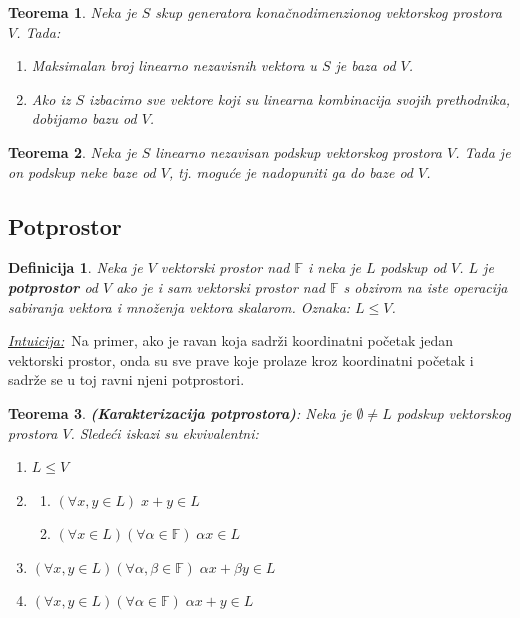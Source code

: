 \documentclass[a4paper,12pt,twoside]{report}
\newtheorem{theorem}{Teorema}[section]
\newtheorem{definition}{Definicija}[section]
\numberwithin{algorithm}{section}
\newcommand{\intuicija}{\noindent\underline{\textit{Intuicija:}}\ }
\begin{document}
\begin{theorem}
    Neka je $S$ skup generatora konačnodimenzionog vektorskog prostora $V$. Tada:
    \begin{enumerate}
        \item Maksimalan broj linearno nezavisnih vektora u $S$ je baza od $V$.
        \item Ako iz $S$ izbacimo sve vektore koji su linearna kombinacija svojih prethodnika, dobijamo bazu od $V$.
    \end{enumerate}
\end{theorem}

\begin{theorem}
    Neka je $S$ linearno nezavisan podskup vektorskog prostora $V$. Tada je on podskup neke baze od $V$, tj. moguće je nadopuniti ga do baze od $V$.
\end{theorem}

\subsection{Potprostor}

\begin{definition}
    Neka je $V$ vektorski prostor nad $\mathbb{F}$ i neka je $L$ podskup od $V$. $L$ je \textbf{potprostor} od $V$ ako je 
    i sam vektorski prostor nad $\mathbb{F}$ s obzirom na iste operacija sabiranja vektora i množenja vektora skalarom. Oznaka: $L \leq V$.
\end{definition}
\intuicija Na primer, ako je ravan koja sadrži koordinatni početak jedan vektorski prostor, onda su sve prave koje prolaze kroz koordinatni početak i 
sadrže se u toj ravni njeni potprostori.
\begin{theorem}
    \textbf{(Karakterizacija potprostora)}: Neka je $\emptyset \neq L$ podskup vektorskog prostora $V$. Sledeći iskazi su ekvivalentni:
    \begin{enumerate}
        \item $L \leq V$
        \item \begin{enumerate}
            \item $(\forall x, y \in L)\;x + y \in L$
            \item $(\forall x \in L)(\forall \alpha \in \mathbb{F})\;\alpha x \in L$
        \end{enumerate}
        \item $(\forall x, y \in L)(\forall \alpha, \beta \in \mathbb{F})\;\alpha x + \beta y \in L$
        \item $(\forall x, y \in L)(\forall \alpha \in \mathbb{F})\;\alpha x +  y \in L$
    \end{enumerate}
\end{theorem}
\end{document}
